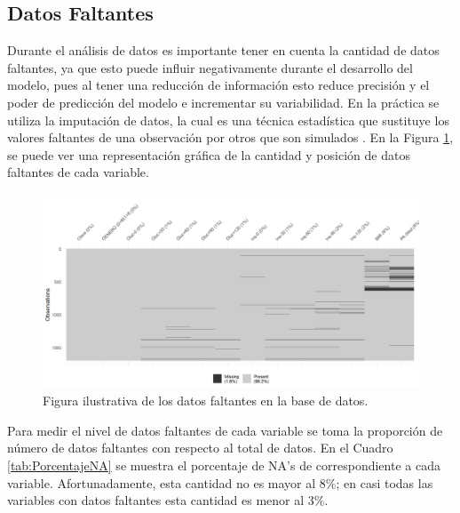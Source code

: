 
\subsection{Datos Faltantes}

Durante el análisis de datos es importante tener en cuenta la cantidad de datos faltantes, ya que esto puede influir negativamente durante el desarrollo del modelo, pues al tener una reducción de información esto reduce precisión y el poder de predicción del modelo e incrementar su variabilidad. En la práctica se utiliza la imputación de datos, la cual es una técnica estadística que sustituye los valores faltantes de una observación por otros que son simulados \cite{Imputacion}. En la Figura \ref{fig:Nas}, se puede ver una representación gráfica de la cantidad y posición de datos faltantes de cada variable.

\begin{figure}[H]
    \centering
    \includegraphics[width = 0.8 \textwidth, height = 6 cm]{Imagenes/datosFaltantes.png}
    \caption{Figura ilustrativa de los datos faltantes en la base de datos.}
    \label{fig:Nas}
\end{figure}

Para medir el nivel de datos faltantes de cada variable se toma la proporción de número de datos faltantes con respecto al total de datos. En el Cuadro \ref{tab:PorcentajeNA} se muestra el porcentaje de NA's de correspondiente a cada variable. Afortunadamente, esta cantidad no es mayor al $8 \%$; en casi todas las variables con datos faltantes esta cantidad es menor al $3\%$. 

